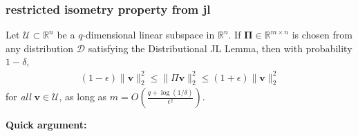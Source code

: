 \documentclass[compress]{beamer}
\newcommand{\bs}[1]{\boldsymbol{#1}}
\newcommand{\bv}[1]{\mathbf{#1}}
\newcommand{\R}{\mathbb{R}}
\begin{document}
\begin{frame}[t]
	\frametitle{restricted isometry property from jl}
	\begin{theorem}
		Let $\mathcal{U} \subset \R^n$ be a $q$-dimensional linear subspace in $\R^n$. If $\bs{\Pi}\in \R^{m\times n}$ is chosen from any distribution $\mathcal{D}$ satisfying the Distributional  JL Lemma, then with probability $1-\delta$,
		\begin{align*}
			(1-\epsilon)\|\bv{v}\|_2^2 \leq \|\Pi \bv{v}\|_2^2 \leq	(1+\epsilon)\|\bv{v}\|_2^2
		\end{align*}
		for \emph{all} $\bv{v} \in \mathcal{U}$, as long as  $m = O\left(\frac{q + \log(1/\delta)}{\epsilon^2}\right)$.
	\end{theorem}
	
	\textbf{Quick argument:}
	
\end{frame}
\end{document}
